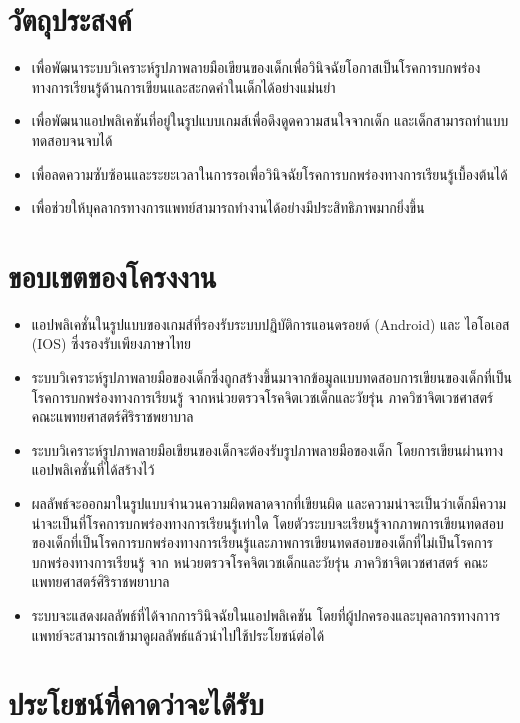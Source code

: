 \documentclass[12pt,oneside,openright,a4paper]{cpe-thai-project}
\begin{document}
\section{วัตถุประสงค์}

\begin{itemize}
  \item  เพื่อพัฒนาระบบวิเคราะห์รูปภาพลายมือเขียนของเด็กเพื่อวินิจฉัยโอกาสเป็นโรคการบกพร่องทางการเรียนรู้ด้านการเขียนและสะกดคำในเด็กได้อย่างแม่นยำ
  \item  เพื่อพัฒนาแอปพลิเคชันที่อยู่ในรูปแบบเกมส์เพื่อดึงดูดความสนใจจากเด็ก และเด็กสามารถทำแบบทดสอบจนจบได้ 
  \item  เพื่อลดความซับซ้อนและระยะเวลาในการรอเพื่อวินิจฉัยโรคการบกพร่องทางการเรียนรู้เบื้องต้นได้
  \item  เพื่อช่วยให้บุคลากรทางการแพทย์สามารถทำงานได้อย่างมีประสิทธิภาพมากยิ่งขึ้น  
  \end{itemize}

\section{ขอบเขตของโครงงาน}

\begin{itemize}
\item  แอปพลิเคชั่นในรูปแบบของเกมส์ที่รองรับระบบปฏิบัติการแอนดรอยด์ (Android)  และ ไอโอเอส (IOS) ซึ่งรองรับเพียงภาษาไทย 
\item  ระบบวิเคราะห์รูปภาพลายมือของเด็กซึ่งถูกสร้างขึ้นมาจากข้อมูลแบบทดสอบการเขียนของเด็กที่เป็นโรคการบกพร่องทางการเรียนรู้ จากหน่วยตรวจโรคจิตเวชเด็กและวัยรุ่น ภาควิชาจิตเวชศาสตร์ คณะแพทยศาสตร์ศิริราชพยาบาล
\item  ระบบวิเคราะห์รูปภาพลายมือเขียนของเด็กจะต้องรับรูปภาพลายมือของเด็ก โดยการเขียนผ่านทางแอปพลิเคชั่นที่ได้สร้างไว้
\item  ผลลัพธ์จะออกมาในรูปแบบจำนวนความผิดพลาดจากที่เขียนผิด และความน่าจะเป็นว่าเด็กมีความน่าจะเป็นที่โรคการบกพร่องทางการเรียนรู้เท่าใด โดยตัวระบบจะเรียนรู้จากภาพการเขียนทดสอบของเด็กที่เป็นโรคการบกพร่องทางการเรียนรู้และภาพการเขียนทดสอบของเด็กที่ไม่เป็นโรคการบกพร่องทางการเรียนรู้ จาก หน่วยตรวจโรคจิตเวชเด็กและวัยรุ่น ภาควิชาจิตเวชศาสตร์ คณะแพทยศาสตร์ศิริราชพยาบาล
\item  ระบบจะแสดงผลลัพธ์ที่ได้จากการวินิจฉัยในแอปพลิเคชัน โดยที่ผู้ปกครองและบุคลากรทางกาารแพทย์จะสามารถเข้ามาดูผลลัพธ์แล้วนำไปใช้ประโยชน์ต่อได้ 
\end{itemize}

\section{ประโยชน์ที่คาดว่าจะได้่รับ}
\end{document}
